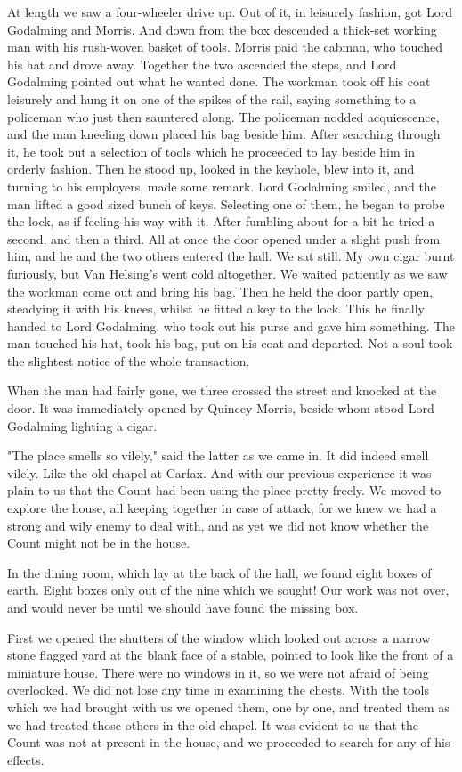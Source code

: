 At length we saw a four-wheeler drive up. Out of it, in leisurely fashion, got Lord Godalming and Morris. And down from the box descended a thick-set working man with his rush-woven basket of tools. Morris paid the cabman, who touched his hat and drove away. Together the two ascended the steps, and Lord Godalming pointed out what he wanted done. The workman took off his coat leisurely and hung it on one of the spikes of the rail, saying something to a policeman who just then sauntered along. The policeman nodded acquiescence, and the man kneeling down placed his bag beside him. After searching through it, he took out a selection of tools which he proceeded to lay beside him in orderly fashion. Then he stood up, looked in the keyhole, blew into it, and turning to his employers, made some remark. Lord Godalming smiled, and the man lifted a good sized bunch of keys. Selecting one of them, he began to probe the lock, as if feeling his way with it. After fumbling about for a bit he tried a second, and then a third. All at once the door opened under a slight push from him, and he and the two others entered the hall. We sat still. My own cigar burnt furiously, but Van Helsing's went cold altogether. We waited patiently as we saw the workman come out and bring his bag. Then he held the door partly open, steadying it with his knees, whilst he fitted a key to the lock. This he finally handed to Lord Godalming, who took out his purse and gave him something. The man touched his hat, took his bag, put on his coat and departed. Not a soul took the slightest notice of the whole transaction. 

When the man had fairly gone, we three crossed the street and knocked at the door. It was immediately opened by Quincey Morris, beside whom stood Lord Godalming lighting a cigar. 

"The place smells so vilely," said the latter as we came in. It did indeed smell vilely. Like the old chapel at Carfax. And with our previous experience it was plain to us that the Count had been using the place pretty freely. We moved to explore the house, all keeping together in case of attack, for we knew we had a strong and wily enemy to deal with, and as yet we did not know whether the Count might not be in the house. 

In the dining room, which lay at the back of the hall, we found eight boxes of earth. Eight boxes only out of the nine which we sought! Our work was not over, and would never be until we should have found the missing box. 

First we opened the shutters of the window which looked out across a narrow stone flagged yard at the blank face of a stable, pointed to look like the front of a miniature house. There were no windows in it, so we were not afraid of being overlooked. We did not lose any time in examining the chests. With the tools which we had brought with us we opened them, one by one, and treated them as we had treated those others in the old chapel. It was evident to us that the Count was not at present in the house, and we proceeded to search for any of his effects. 

